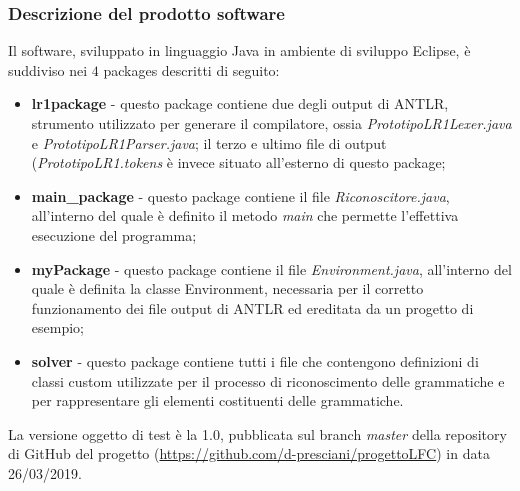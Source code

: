 \documentclass[12pt]{article}
\begin{document}
\subsubsection{Descrizione del prodotto software}
Il software, sviluppato in linguaggio Java in ambiente di sviluppo Eclipse, è suddiviso nei $4$ packages descritti di seguito:
\begin{itemize}
\item \textbf{lr1package} - questo package contiene due degli output di ANTLR, strumento utilizzato per generare il compilatore, ossia \textit{PrototipoLR1Lexer.java} e \textit{PrototipoLR1Parser.java}; il terzo e ultimo file di output (\textit{PrototipoLR1.tokens} è invece situato all'esterno di questo package;
\item \textbf{main\_package} - questo package contiene il file \textit{Riconoscitore.java}, all'interno del quale è definito il metodo \textit{main} che permette l'effettiva esecuzione del programma;
\item \textbf{myPackage} - questo package contiene il file \textit{Environment.java}, all'interno del quale è definita la classe Environment, necessaria per il corretto funzionamento dei file output di ANTLR ed ereditata da un progetto di esempio;
\item \textbf{solver} - questo package contiene tutti i file che contengono definizioni di classi custom utilizzate per il processo di riconoscimento delle grammatiche e per rappresentare gli elementi costituenti delle grammatiche.
\end{itemize}
La versione oggetto di test è la 1.0, pubblicata sul branch \textit{master} della repository di GitHub del progetto (\url{https://github.com/d-presciani/progettoLFC}) in data 26/03/2019.
\pagebreak
\end{document}
